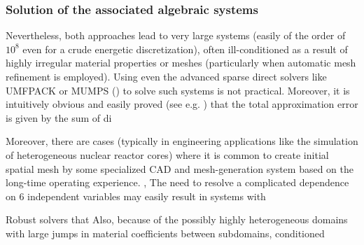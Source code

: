 \subsubsection{Solution of the associated algebraic systems}

Nevertheless, both approaches lead to very large systems (easily of the order of $10^8$ even for a crude energetic
discretization), often ill-conditioned as a result of highly irregular material properties or meshes
(particularly when automatic mesh refinement is employed). Using even the advanced sparse direct solvers like
UMFPACK or MUMPS (\cite{UMFPACK,MUMPS}) to solve such systems is not practical.
Moreover, it is intuitively obvious and easily proved (see e.g. \cite{Arioli}) that the total approximation error is
given by the sum of di

Moreover, there are cases (typically
in engineering applications like the simulation of heterogeneous nuclear reactor cores) where it is common to create
initial spatial mesh by some specialized CAD and mesh-generation system based on the long-time operating experience. ,
The need to resolve a complicated dependence on 6 independent variables may easily result in systems with

Robust solvers that Also, because of the possibly highly heterogeneous domains with large jumps in material coefficients
between subdomains, conditioned
